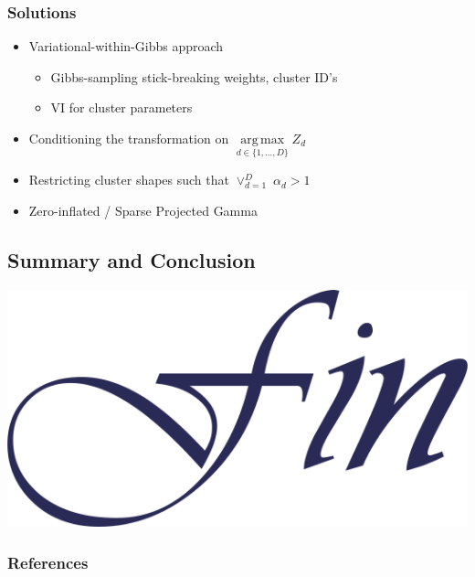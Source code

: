 \documentclass[aspectratio=169,10pt]{beamer}
\DeclareMathOperator*{\argmax}{arg\,max}
\newlength{\frametextheight}
\begin{document}
\begin{frame}
    \frametitle{Solutions}
    \begin{itemize}
        \item Variational-within-Gibbs approach \cite{Loaizamaya2022}
        \begin{itemize}
            \item Gibbs-sampling stick-breaking weights, cluster ID's
            \item VI for cluster parameters
        \end{itemize}
        \item Conditioning the transformation on 
            $\argmax\limits_{d \in \lbrace 1,\ldots, D\rbrace} Z_d$
        \item Restricting cluster shapes such that $\vee_{d = 1}^D\; \alpha_d > 1$
        \item Zero-inflated / Sparse Projected Gamma
    \end{itemize}
\end{frame}


\subsection{Summary and Conclusion}






\begin{frame}[plain]
    \begin{center}
        \includegraphics[height=0.7\frametextheight]{./ch1/images/fin}
    \end{center}
\end{frame} %

\begin{frame}[allowframebreaks]
    \frametitle{References}
    \footnotesize
    
\end{frame}
\end{document}

